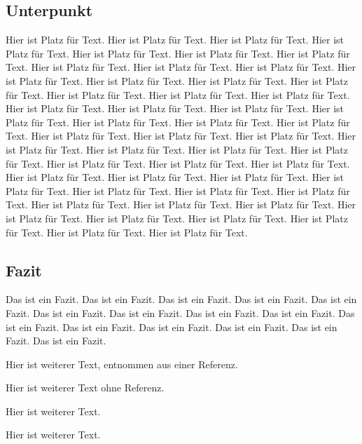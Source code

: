 \subsection{Unterpunkt}
Hier ist Platz für Text. Hier ist Platz für Text. Hier ist Platz für Text. Hier ist Platz für Text. Hier ist Platz für Text. Hier ist Platz für Text. Hier ist Platz für Text. Hier ist Platz für Text. Hier ist Platz für Text. Hier ist Platz für Text. Hier ist Platz für Text. Hier ist Platz für Text. Hier ist Platz für Text. Hier ist Platz für Text. Hier ist Platz für Text. Hier ist Platz für Text. Hier ist Platz für Text. Hier ist Platz für Text. Hier ist Platz für Text. Hier ist Platz für Text. Hier ist Platz für Text. Hier ist Platz für Text. Hier ist Platz für Text. Hier ist Platz für Text. Hier ist Platz für Text. Hier ist Platz für Text. Hier ist Platz für Text. Hier ist Platz für Text. Hier ist Platz für Text. Hier ist Platz für Text. Hier ist Platz für Text. Hier ist Platz für Text. Hier ist Platz für Text. Hier ist Platz für Text. Hier ist Platz für Text. Hier ist Platz für Text. Hier ist Platz für Text. Hier ist Platz für Text. Hier ist Platz für Text. Hier ist Platz für Text. Hier ist Platz für Text. Hier ist Platz für Text. Hier ist Platz für Text. Hier ist Platz für Text. Hier ist Platz für Text. Hier ist Platz für Text. Hier ist Platz für Text. Hier ist Platz für Text. Hier ist Platz für Text. Hier ist Platz für Text. 

\subsection{Fazit}
Das ist ein Fazit. Das ist ein Fazit. Das ist ein Fazit. Das ist ein Fazit. Das ist ein Fazit. Das ist ein Fazit. Das ist ein Fazit. Das ist ein Fazit. Das ist ein Fazit. Das ist ein Fazit. Das ist ein Fazit. Das ist ein Fazit. Das ist ein Fazit. Das ist ein Fazit. Das ist ein Fazit.


Hier ist weiterer Text, entnommen aus einer Referenz. \cite{Reference:00}



Hier ist weiterer Text ohne Referenz.



Hier ist weiterer Text.

Hier ist weiterer Text.